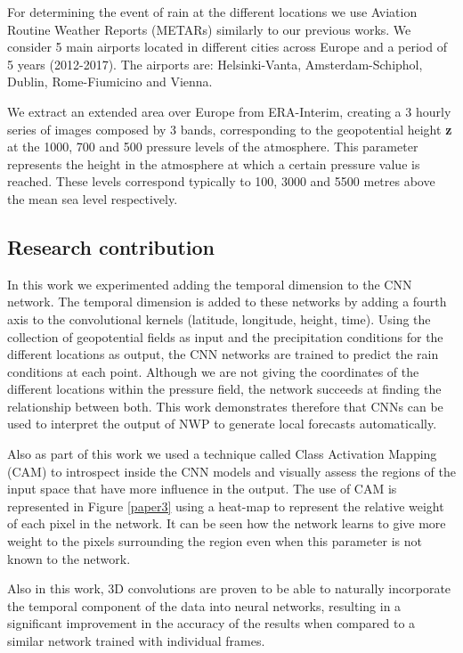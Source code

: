 \medskip

For determining the event of rain at the different locations we use Aviation Routine Weather Reports (METARs) similarly to our previous works. We consider 5 main airports located in different cities across Europe and a period of 5 years (2012-2017). The airports are: Helsinki-Vanta, Amsterdam-Schiphol, Dublin, Rome-Fiumicino and Vienna.

\medskip

We extract an extended area over Europe from ERA-Interim, creating a 3 hourly series of images composed by 3 bands, corresponding to the geopotential height \textbf{z} at the 1000, 700 and 500 pressure levels of the atmosphere. This parameter represents the height in the atmosphere at which a certain pressure value is reached. These levels correspond typically to 100, 3000 and 5500 metres above the mean sea level respectively.

\subsection{Research contribution}

In this work we experimented adding the temporal dimension to the CNN network. The temporal dimension is added to these networks by adding a fourth axis to the convolutional kernels (latitude, longitude, height, time). Using the collection of geopotential fields as input and the precipitation conditions for the different locations as output, the CNN networks are trained to predict the rain conditions at each point. Although we are not giving the coordinates of the different locations within the pressure field, the network succeeds at finding the relationship between both. This work demonstrates therefore that CNNs can be used to interpret the output of NWP to generate local forecasts automatically.

\medskip

Also as part of this work we used a technique called Class Activation Mapping (CAM) \citep{zhou2016learning} to introspect inside the CNN models and visually assess the regions of the input space that have more influence in the output. The use of CAM is represented in Figure \ref{paper3} using a heat-map to represent the relative weight of each pixel in the network. It can be seen how the network learns to give more weight to the pixels surrounding the region even when this parameter is not known to the network.

\medskip

Also in this work, 3D convolutions are proven to be able to naturally incorporate the temporal component of the data into neural networks, resulting in a significant improvement in the accuracy of the results when compared to a similar network trained with individual frames.

